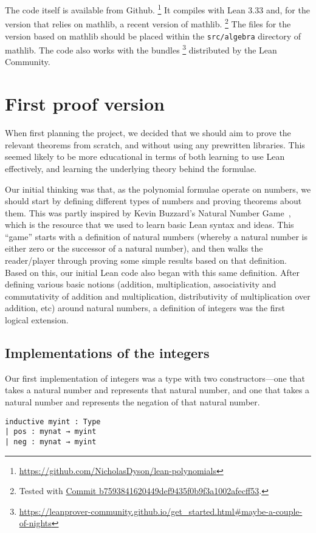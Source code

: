 \documentclass{article} %
\theoremstyle{plain}
\theoremstyle{definition}
\newcommand{\Lean}{\textsf{Lean}\xspace}
\newcommand{\mathlib}{\textsf{mathlib}\xspace}
\begin{document}
The code itself is available from Github.%
\footnote{\url{https://github.com/NicholasDyson/lean-polynomials}} 
It compiles with Lean 3.33 and, for the version that relies on \mathlib, a recent version of \mathlib.%
\footnote{Tested with \href{https://github.com/leanprover-community/mathlib/commit/b7593841620449def9435f0b9f3a1002afecff53}{Commit b7593841620449def9435f0b9f3a1002afecff53}.}
The files for the version based on \mathlib should be placed within the \lstinline!src/algebra! directory of \mathlib.
The code also works with the bundles%
\footnote{\url{https://leanprover-community.github.io/get_started.html\#maybe-a-couple-of-nights}}
distributed by the Lean Community.
%


\section{First proof version}
\label{sec:firstproof}


When first planning the project, we decided that we should aim to prove the relevant theorems from scratch, and without using any prewritten libraries.
This seemed likely to be more educational in terms of both learning to use \Lean effectively, and learning the underlying theory behind the formulae.

Our initial thinking was that, as the polynomial formulae operate on numbers, we should start by defining different types of numbers and proving theorems about them.
This was partly inspired by Kevin Buzzard's Natural Number Game~\cite{buzzard20}, which is the resource that we used to learn basic \Lean syntax and ideas.
This ``game'' starts with a definition of natural numbers (whereby a natural number is either zero or the successor of a natural number), and then walks the reader/player through proving some simple results based on that definition.
Based on this, our initial \Lean code also began with this same definition.
After defining various basic notions (addition, multiplication, associativity and commutativity of addition and multiplication,
distributivity of multiplication over addition, etc)
around natural numbers, a definition of integers was the first logical extension. 

\subsection{Implementations of the integers}
Our first implementation of integers was a type with two constructors---one that takes a natural number and represents that natural number,
and one that takes a natural number and represents the negation of that natural number.
\begin{lstlisting}
inductive myint : Type
| pos : mynat → myint
| neg : mynat → myint
\end{lstlisting}
\end{document}
